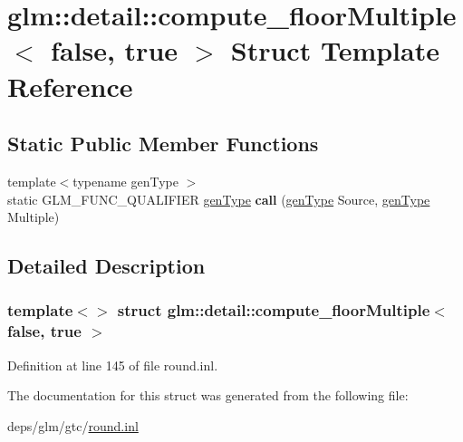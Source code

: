\hypertarget{structglm_1_1detail_1_1compute__floorMultiple_3_01false_00_01true_01_4}{}\section{glm\+:\+:detail\+:\+:compute\+\_\+floor\+Multiple$<$ false, true $>$ Struct Template Reference}
\label{structglm_1_1detail_1_1compute__floorMultiple_3_01false_00_01true_01_4}
\subsection*{Static Public Member Functions}
\begin{DoxyCompactItemize}
\item 
\mbox{\label{structglm_1_1detail_1_1compute__floorMultiple_3_01false_00_01true_01_4_a1d2dfa9746c67e805de83b41b6a7a94d}} 
{\footnotesize template$<$typename gen\+Type $>$ }\\static G\+L\+M\+\_\+\+F\+U\+N\+C\+\_\+\+Q\+U\+A\+L\+I\+F\+I\+ER \hyperlink{structglm_1_1detail_1_1genType}{gen\+Type} {\bfseries call} (\hyperlink{structglm_1_1detail_1_1genType}{gen\+Type} Source, \hyperlink{structglm_1_1detail_1_1genType}{gen\+Type} Multiple)
\end{DoxyCompactItemize}


\subsection{Detailed Description}
\subsubsection*{template$<$$>$\newline
struct glm\+::detail\+::compute\+\_\+floor\+Multiple$<$ false, true $>$}



Definition at line 145 of file round.\+inl.



The documentation for this struct was generated from the following file\+:\begin{DoxyCompactItemize}
\item 
deps/glm/gtc/\hyperlink{round_8inl}{round.\+inl}\end{DoxyCompactItemize}
